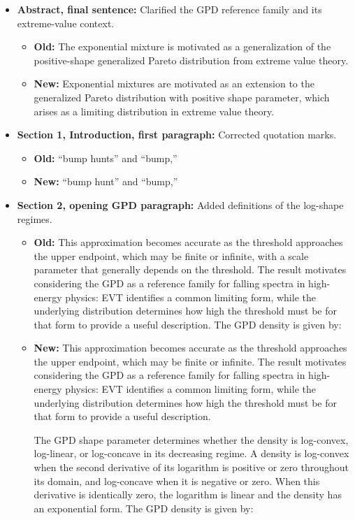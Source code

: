 \documentclass[11pt,a4paper]{article}
\begin{document}
\begin{itemize}
    \item \textbf{Abstract, final sentence:} Clarified the GPD reference family and its extreme-value context.
    \begin{itemize}
        \item \textbf{Old:} The exponential mixture is motivated as a generalization of the positive-shape generalized Pareto distribution from extreme value theory.
        \item \textbf{New:} Exponential mixtures are motivated as an extension to the generalized Pareto distribution with positive shape parameter, which arises as a limiting distribution in extreme value theory.
    \end{itemize}

    \item \textbf{Section 1, Introduction, first paragraph:} Corrected quotation marks.
    \begin{itemize}
        \item \textbf{Old:} ``bump hunts'' and ``bump,''
        \item \textbf{New:} ``bump hunt'' and ``bump,''
    \end{itemize}

    \item \textbf{Section 2, opening GPD paragraph:} Added definitions of the log-shape regimes.
    \begin{itemize}
        \item \textbf{Old:} This approximation becomes accurate as the threshold approaches the upper endpoint, which may be finite or infinite, with a scale parameter that generally depends on the threshold. The result motivates considering the GPD as a reference family for falling spectra in high-energy physics: EVT identifies a common limiting form, while the underlying distribution determines how high the threshold must be for that form to provide a useful description. The GPD density is given by:
        \item \textbf{New:} This approximation becomes accurate as the threshold approaches the upper endpoint, which may be finite or infinite. The result motivates considering the GPD as a reference family for falling spectra in high-energy physics: EVT identifies a common limiting form, while the underlying distribution determines how high the threshold must be for that form to provide a useful description.

        The GPD shape parameter determines whether the density is log-convex, log-linear, or log-concave in its decreasing regime. A density is log-convex when the second derivative of its logarithm is positive or zero throughout its domain, and log-concave when it is negative or zero. When this derivative is identically zero, the logarithm is linear and the density has an exponential form. The GPD density is given by:
    \end{itemize}


\end{itemize}
\end{document}
